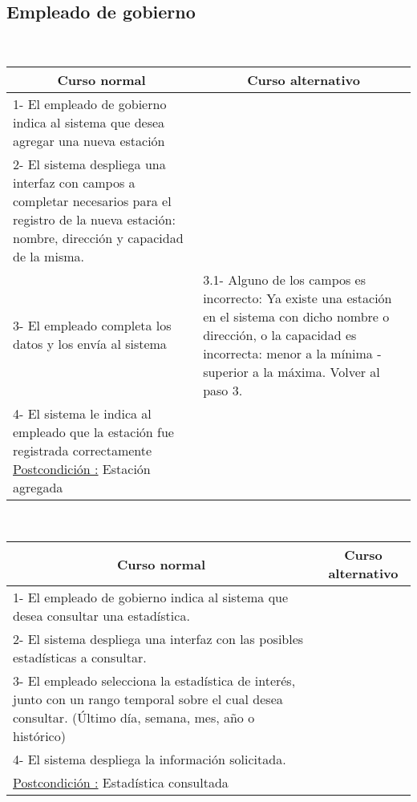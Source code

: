\subsection{Empleado de gobierno}

~


\begin{center}
    \centering
    \begin{tabular}{ | p{11cm} | p{6cm} | }
    	\multicolumn{1}{c}{\cellcolor{black!30}\textbf{Curso normal}} & 
    	\multicolumn{1}{c}{\cellcolor{black!30}\textbf{Curso alternativo}} \\ \hline
    	1- El empleado de gobierno indica al sistema que desea agregar una nueva estación & \\ \hline
    	2- El sistema despliega una interfaz con campos a completar necesarios para el registro de la 
    	nueva estación: nombre, dirección y capacidad de la misma. & \\ \hline
    	3- El empleado completa los datos y los envía al sistema & 3.1- Alguno de los campos es incorrecto:
    	Ya existe una estación en el sistema con dicho nombre o dirección, o la capacidad es incorrecta:
    	menor a la mínima - superior a la máxima. Volver al paso 3. \\ \hline
    	4- El sistema le indica al empleado que la estación fue registrada correctamente
		\underline{Postcondición :} Estación agregada & \\ \hline
    \end{tabular}
\end{center}

~


\begin{center}
    \centering
    \begin{tabular}{ | p{11cm} | p{6cm} | }
    	\multicolumn{1}{c}{\cellcolor{black!30}\textbf{Curso normal}} & 
    	\multicolumn{1}{c}{\cellcolor{black!30}\textbf{Curso alternativo}} \\ \hline
    	1- El empleado de gobierno indica al sistema que desea consultar una estadística. & \\ \hline
    	2- El sistema despliega una interfaz con las posibles estadísticas a consultar. & \\ \hline
    	3- El empleado selecciona la estadística de interés, junto con un rango temporal sobre el cual
    	desea consultar. (Último día, semana, mes, año o histórico) & \\ \hline
    	4- El sistema despliega la información solicitada. & \\ \hline
		\underline{Postcondición :} Estadística consultada & \\ \hline
    \end{tabular}
\end{center}

